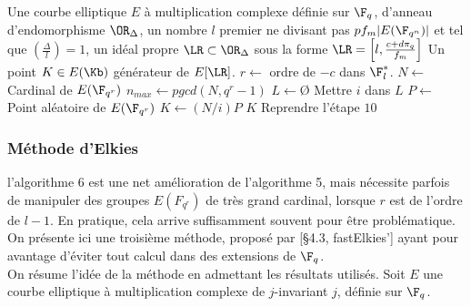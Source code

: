 \begin{algorithm}
	\caption{Point générateur d'un groupe de $\LR$-torsion, méthode 2}
	\begin{algorithmic}[1]
		\Require Une courbe elliptique $E$ à multiplication complexe définie sur $\F_{q}$, d'anneau d'endomorphisme $\OR_{\Delta}$, un nombre $l$ premier ne divisant pas $pf_{m}|E(\F_{q^{n}})|$ et tel que $\left( \frac{\Delta}{l}\right) = 1$, un idéal propre $\LR\subset\OR_{\Delta}$ sous la forme $\LR = \left[ l, \frac{c + d\pi_{q}}{f_{m}}\right]$
		\Ensure Un point $K\in E(\Kb)$ générateur de $E[\LR]$. 
		\State $r\gets$ ordre de $-c$ dans $\F_{l}^{*}$.
		\State $N\gets$ Cardinal de $E(\F_{q^{r}})$
		\State $n_{max} \gets pgcd(N, q^r - 1)$
		\State $L\gets$\O
		\State Mettre $i$ dans $L$
		\EndIf
		\EndFor
		\State $P\gets$ Point aléatoire de $E(\F_{q^{r}})$
		\State $K\gets (N/i)P$
		\Return $K$ 
		\EndIf
		\EndIf
		\EndFor
		\State Reprendre l'étape $10$
	\end{algorithmic}
\end{algorithm}








	
\subsubsection{Méthode d'Elkies}

l'algorithme 6 est une net amélioration de l'algorithme 5, mais nécessite parfois de manipuler des groupes $E(F_{q^{r}})$ de très grand cardinal, lorsque $r$ est de l'ordre de $l-1$. En pratique, cela arrive suffisamment souvent pour être problématique. On présente ici une troisième méthode, proposé par \cite{Bostan_2008}[\S 4.3, fastElkies'] ayant pour avantage d'éviter tout calcul dans des extensions de $\F_{q}$.\\ 

On résume l'idée de la méthode en admettant les résultats utilisés. Soit $E$ une courbe elliptique à multiplication complexe de $j$-invariant $j$, définie sur $\F_{q}$.

